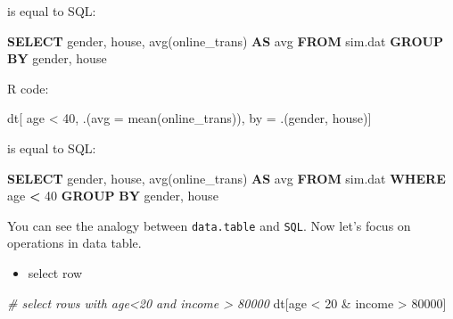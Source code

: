 \documentclass[
  12pt,
]{krantz}
\makeatletter
\newenvironment{Shaded}{\begin{snugshade}}{\end{snugshade}}
\newcommand{\AttributeTok}[1]{\textcolor[rgb]{0.61,0.61,0.61}{#1}}
\newcommand{\CommentTok}[1]{\textcolor[rgb]{0.37,0.37,0.37}{\textit{#1}}}
\newcommand{\DecValTok}[1]{\textcolor[rgb]{0.06,0.06,0.06}{#1}}
\newcommand{\FunctionTok}[1]{\textcolor[rgb]{0,0,0}{#1}}
\newcommand{\KeywordTok}[1]{\textcolor[rgb]{0.27,0.27,0.27}{\textbf{#1}}}
\newcommand{\NormalTok}[1]{#1}
\newcommand{\OperatorTok}[1]{\textcolor[rgb]{0.43,0.43,0.43}{\textbf{#1}}}
\newcommand{\OtherTok}[1]{\textcolor[rgb]{0.37,0.37,0.37}{#1}}
\newcommand{\SpecialCharTok}[1]{\textcolor[rgb]{0,0,0}{#1}}
\providecommand{\tightlist}{%
  \setlength{\itemsep}{0pt}\setlength{\parskip}{0pt}}
\newenvironment{kframe}{%
\medskip{}
\setlength{\fboxsep}{.8em}
 \def\at@end@of@kframe{}%
 \ifinner\ifhmode%
  \def\at@end@of@kframe{\end{minipage}}%
  \begin{minipage}{\columnwidth}%
 \fi\fi%
 \def\FrameCommand##1{\hskip\@totalleftmargin \hskip-\fboxsep
 \colorbox{shadecolor}{##1}\hskip-\fboxsep
     \hskip-\linewidth \hskip-\@totalleftmargin \hskip\columnwidth}%
 \MakeFramed {\advance\hsize-\width
   \@totalleftmargin\z@ \linewidth\hsize
   \@setminipage}}%
 {\par\unskip\endMakeFramed%
 \at@end@of@kframe}
\renewenvironment{Shaded}{\begin{kframe}}{\end{kframe}}
\makeatother
\begin{document}
is equal to SQL:

\begin{Shaded}
\begin{Highlighting}[]
\KeywordTok{SELECT}
\NormalTok{   gender,}
\NormalTok{   house,}
   \FunctionTok{avg}\NormalTok{(online\_trans) }\KeywordTok{AS} \FunctionTok{avg} 
\KeywordTok{FROM}
\NormalTok{   sim.dat }
\KeywordTok{GROUP} \KeywordTok{BY}
\NormalTok{   gender,}
\NormalTok{   house}
\end{Highlighting}
\end{Shaded}

R code:

\begin{Shaded}
\begin{Highlighting}[]
\NormalTok{dt[ age }\SpecialCharTok{\textless{}} \DecValTok{40}\NormalTok{, .(}\AttributeTok{avg =} \FunctionTok{mean}\NormalTok{(online\_trans)), by }\OtherTok{=}\NormalTok{ .(gender, house)]}
\end{Highlighting}
\end{Shaded}

is equal to SQL:

\begin{Shaded}
\begin{Highlighting}[]
\KeywordTok{SELECT}
\NormalTok{   gender,}
\NormalTok{   house,}
   \FunctionTok{avg}\NormalTok{(online\_trans) }\KeywordTok{AS} \FunctionTok{avg} 
\KeywordTok{FROM}
\NormalTok{   sim.dat }
\KeywordTok{WHERE}
\NormalTok{   age }\OperatorTok{\textless{}} \DecValTok{40} 
\KeywordTok{GROUP} \KeywordTok{BY}
\NormalTok{   gender,}
\NormalTok{   house}
\end{Highlighting}
\end{Shaded}

You can see the analogy between \texttt{data.table} and \texttt{SQL}. Now let's focus on operations in data table.

\begin{itemize}
\tightlist
\item
  select row
\end{itemize}

\begin{Shaded}
\begin{Highlighting}[]
\CommentTok{\# select rows with age\textless{}20 and income \textgreater{} 80000}
\NormalTok{dt[age }\SpecialCharTok{\textless{}} \DecValTok{20} \SpecialCharTok{\&}\NormalTok{ income }\SpecialCharTok{\textgreater{}} \DecValTok{80000}\NormalTok{]}
\end{Highlighting}
\end{Shaded}
\end{document}
